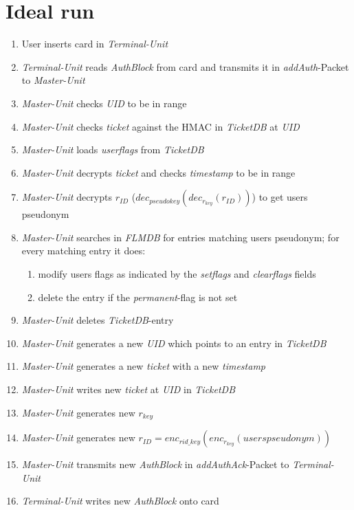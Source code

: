 \section{Ideal run}
 \begin{enumerate}
 \item User inserts card in \textit{Terminal-Unit}
 \item \textit{Terminal-Unit} reads \textit{AuthBlock} from card and transmits it in \textit{addAuth}-Packet to \textit{\textit{Master-Unit}}
 \item \textit{Master-Unit} checks \textit{UID} to be in range
 \item \textit{Master-Unit} checks \textit{ticket} against the HMAC in \textit{TicketDB} at \textit{UID}
 \item \textit{Master-Unit} loads \textit{userflags} from \textit{TicketDB}
 \item \textit{Master-Unit} decrypts \textit{ticket} and checks \textit{timestamp} to be in range
 \item \textit{Master-Unit} decrypts \textit{$r_{ID}$} ($dec_{pseudokey}(dec_{r_{key}}(r_{ID}))$) to get users pseudonym
 \item \textit{Master-Unit} searches in \textit{FLMDB} for entries matching users pseudonym; for every matching entry it does:
  \begin{enumerate}
  \item modify users flags as indicated by the \textit{setflags} and \textit{clearflags} fields
  \item delete the entry if the \textit{permanent}-flag is not set
  \end{enumerate}
 \item \textit{Master-Unit} deletes \textit{TicketDB}-entry
 \item \textit{Master-Unit} generates a new \textit{UID} which points to an entry in \textit{TicketDB}
 \item \textit{Master-Unit} generates a new \textit{ticket} with a new \textit{timestamp}
 \item \textit{Master-Unit} writes new \textit{ticket} at \textit{UID} in \textit{TicketDB}
 \item \textit{Master-Unit} generates new \textit{$r_{key}$}
 \item \textit{Master-Unit} generates new \textit{$r_{ID}$}$=enc_{rid\_key}(enc_{r_{key}}(users pseudonym))$ 
 \item \textit{Master-Unit} transmits new \textit{AuthBlock} in \textit{addAuthAck}-Packet to \textit{Terminal-Unit}
 \item \textit{Terminal-Unit} writes new \textit{AuthBlock} onto card
 \end{enumerate}
